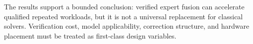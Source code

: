 The results support a bounded conclusion: verified expert fusion can accelerate
qualified repeated workloads, but it is not a universal replacement for classical
solvers. Verification cost, model applicability, correction structure, and
hardware placement must be treated as first-class design variables.
